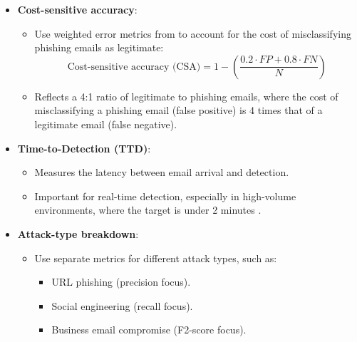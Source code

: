 \begin{itemize}
  \item \textbf{Cost-sensitive accuracy}:
  \begin{itemize}
    \item Use weighted error metrics from \cite{atlam2022business} to account for the cost of misclassifying phishing emails as legitimate:
    \begin{equation}
      \text{Cost-sensitive accuracy (CSA)} = 1 - \left(\frac{0.2 \cdot FP + 0.8 \cdot FN}{N}\right)
    \end{equation}
    \item Reflects a 4:1 ratio of legitimate to phishing emails, where the cost of misclassifying a phishing email (false positive) is 4 times that of a legitimate email (false negative).
  \end{itemize}
  \item \textbf{Time-to-Detection (TTD)}:
  \begin{itemize}
    \item Measures the latency between email arrival and detection.
    \item Important for real-time detection, especially in high-volume environments, where the target is under 2 minutes \citep{shirazi2022towards}.
  \end{itemize}
  \item \textbf{Attack-type breakdown}:
  \begin{itemize}
    \item Use separate metrics for different attack types, such as:
    \begin{itemize}
      \item URL phishing (precision focus).
      \item Social engineering (recall focus).
      \item Business email compromise (F2-score focus).
    \end{itemize}
  \end{itemize}
\end{itemize}
